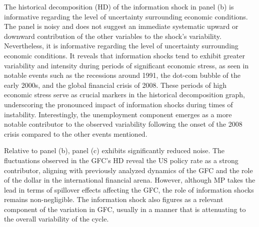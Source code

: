 \documentclass[11pt,a4paper]{article}
\begin{document}
The historical decomposition (HD) of the information shock in panel (b) is informative regarding the level of uncertainty surrounding economic conditions. 
The panel is noisy and does not suggest an immediate systematic upward or downward contribution of the other variables to the shock's variability. 
Nevertheless, it is informative regarding the level of uncertainty surrounding economic conditions. 
It reveals that information shocks tend to exhibit greater variability and intensity during periods of significant economic stress, as seen in notable events such as the recessions around 1991, the dot-com bubble of the early 2000s, and the global financial crisis of 2008. These periods of high economic stress serve as crucial markers in the historical decomposition graph, underscoring the pronounced impact of information shocks during times of instability.
Interestingly, the unemployment component emerges as a more notable contributor to the observed variability following the onset of the 2008 crisis compared to the other events mentioned. %




Relative to panel (b), panel (c) exhibits significantly reduced noise. 
The fluctuations observed in the GFC's HD reveal the US policy rate as a strong contributor, aligning with previously analyzed dynamics of the GFC and the role of the dollar in the international financial arena. 
However, although MP takes the lead in terms of spillover effects affecting the GFC, the role of information shocks remains non-negligible.
The information shock also figures as a relevant component of the variation in GFC, usually in a manner that is attenuating to the overall variability of the cycle. %
\end{document}
